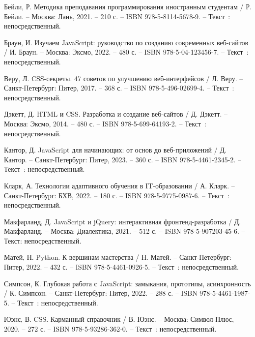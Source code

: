 
\begin{thebibliography}{9}

     Бейли, Р. Методика преподавания программирования иностранным студентам / Р. Бейли. – Москва: Лань, 2021. – 210 с. – ISBN 978-5-8114-5678-9. – Текст~: непосредственный.
    
     Браун, И. Изучаем JavaScript: руководство по созданию современных веб-сайтов / И. Браун. – Москва: Эксмо, 2022. – 480 с. – ISBN 978-5-04-123456-7. – Текст~: непосредственный.
    
     Веру, Л. CSS-секреты. 47 советов по улучшению веб-интерфейсов / Л. Веру. – Санкт-Петербург: Питер, 2017. – 368 с. – ISBN 978-5-496-02699-4. – Текст~: непосредственный.
    
     Дэкетт, Д. HTML и CSS. Разработка и создание веб-сайтов / Д. Дэкетт. – Москва: Эксмо, 2014. – 480 с. – ISBN 978-5-699-64193-2. – Текст~: непосредственный.

     Кантор, Д. JavaScript для начинающих: от основ до веб-приложений / Д. Кантор. – Санкт-Петербург: Питер, 2023. – 360 с. – ISBN 978-5-4461-2345-2. – Текст~: непосредственный.
    
     Кларк, А. Технологии адаптивного обучения в IT-образовании / А. Кларк. – Санкт-Петербург: БХВ, 2022. – 180 с. – ISBN 978-5-9775-0987-6. – Текст~: непосредственный.
    
     Макфарланд, Д. JavaScript и jQuery: интерактивная фронтенд-разработка / Д. Макфарланд. – Москва: Диалектика, 2021. – 512 с. – ISBN 978-5-907203-45-6. – Текст: непосредственный.  

     Матей, Н. Python. К вершинам мастерства / Н. Матей. – Санкт-Петербург: Питер, 2022. – 432 с. – ISBN 978-5-4461-0926-5. – Текст~: непосредственный.

     Симпсон, К. Глубокая работа с JavaScript: замыкания, прототипы, асинхронность / К. Симпсон. – Санкт-Петербург: Питер, 2022. – 288 с. – ISBN 978-5-4461-1987-5. – Текст~: непосредственный.  

     Юэнс, В. CSS. Карманный справочник / В. Юэнс. – Москва: Символ-Плюс, 2020. – 272 с. – ISBN 978-5-93286-362-0. – Текст~: непосредственный.


\end{thebibliography}
